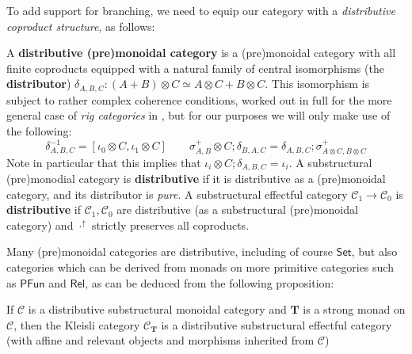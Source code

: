 \documentclass[acmsmall,screen,review]{acmart}
\newcommand{\mc}[1]{\ensuremath{\mathcal{#1}}}
\newcommand{\mb}[1]{\ensuremath{\mathbf{#1}}}
\newcommand{\ms}[1]{\ensuremath{\mathsf{#1}}}
\newcommand{\upg}[2]{{#1}^{\uparrow #2}}
\begin{document}
To add support for branching, we need to equip our category with a
\textit{distributive coproduct structure}, as follows:
\begin{definition} 
  A \textbf{distributive (pre)monoidal category} is a (pre)monoidal category
  with all finite coproducts equipped with a natural family of central
  isomorphisms (the \textbf{distributor}) \(\delta_{A, B, C}: (A + B) \otimes C
  \simeq A \otimes C + B \otimes C\). This isomorphism is subject to rather
  complex coherence conditions, worked out in full for the more general case of
  \textit{rig categories} in \cite{laplaza-distributivity}, but for our purposes
  we will only make use of the following:
  \begin{equation*}
    \delta_{A, B, C}^{-1} = [\iota_0 \otimes C, \iota_1 \otimes C] 
    \qquad
    \sigma^+_{A, B} \otimes C;\delta_{B, A, C} = \delta_{A, B, C};\sigma^+_{A \otimes C, B \otimes C}
  \end{equation*}
  Note in particular that this implies that \(\iota_i \otimes C;\delta_{A, B, C}
  = \iota_i\). A substructural (pre)monodial category is \textbf{distributive}
  if it is distributive as a (pre)monoidal category, and its distributor is
  \textit{pure}. A substructural effectful category \(\mc{C}_1 \to \mc{C}_0\) is
  \textbf{distributive} if \(\mc{C}_1, \mc{C}_0\) are distributive (as a
  substructural (pre)monoidal category) and \(\upg{\cdot}{}\) strictly preserves
  all coproducts.
\end{definition}
Many (pre)monoidal categories are distributive, including of course
\(\ms{Set}\), but also categories which can be derived from monads on more
primitive categories such as \(\ms{PFun}\) and \(\ms{Rel}\), as can be deduced
from the following proposition:
\begin{proposition}
  If \(\mc{C}\) is a distributive substructural monoidal category and \(\mb{T}\)
  is a strong monad on \(\mc{C}\), then the Kleisli category \(\mc{C}_{\mb{T}}\)
  is a distributive substructural effectful category (with affine and relevant
  objects and morphisms inherited from \(\mc{C}\))
\end{proposition}
\end{document}
